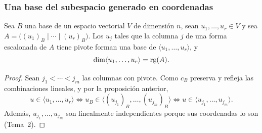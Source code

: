 \begin{frame}
    \frametitle{Una base del subespacio generado en coordenadas}

    \begin{corollary}
        Sea $B$ una base de un espacio vectorial $V$ de dimensión $n$, sean
        $u_1,\ldots,u_r\in V$ y sea
        $A=\bigl((u_1)_B\mid\cdots\mid(u_r)_B\bigr)$. Los $u_j$ tales que
        la columna $j$ de una forma escalonada de $A$ tiene pivote forman
        una base de $\langle u_1,\ldots,u_r\rangle$, y
        \[
            \dim\langle u_1,\ldots,u_r\rangle=\operatorname{rg}(A).
        \]
    \end{corollary}

    \begin{proof}
        Sean $j_1<\cdots<j_m$ las columnas con pivote. Como $c_B$ preserva
        y refleja las combinaciones lineales, y por la proposición anterior,
        \[
            u\in\langle u_1,\ldots,u_r\rangle
            \iff u_B\in\langle(u_{j_1})_B,\ldots,(u_{j_m})_B\rangle
            \iff u\in\langle u_{j_1},\ldots,u_{j_m}\rangle.
        \]
        Además, $u_{j_1},\ldots,u_{j_m}$ son linealmente independientes
        porque sus coordenadas lo son (Tema~2).
    \end{proof}
\end{frame}

